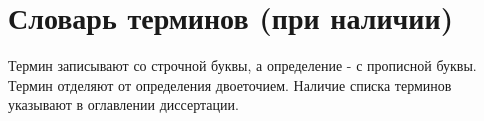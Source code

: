 \chapter*{Словарь терминов (при наличии)} %
\noindent

Термин записывают со строчной буквы, а определение - с прописной буквы. Термин отделяют от определения двоеточием. Наличие списка терминов указывают в оглавлении диссертации. 